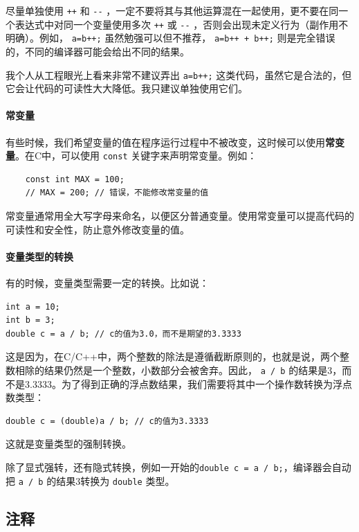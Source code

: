 \begin{remark}{}
    尽量单独使用 \verb|++| 和 \verb|--| ，一定不要将其与其他运算混在一起使用，更不要在同一个表达式中对同一个变量使用多次 \verb|++| 或 \verb|--| ，否则会出现未定义行为（副作用不明确）。例如， \verb|a=b++;| 虽然勉强可以但不推荐， \verb|a=b++ + b++;| 则是完全错误的，不同的编译器可能会给出不同的结果。

    我个人从工程眼光上看来非常不建议弄出 \verb|a=b++;| 这类代码，虽然它是合法的，但它会让代码的可读性大大降低。我只建议单独使用它们。
\end{remark}

\paragraph{常变量}

有些时候，我们希望变量的值在程序运行过程中不被改变，这时候可以使用\textbf{常变量}。在C中，可以使用 \verb|const| 关键字来声明常变量。例如：
\begin{verbatim}
    const int MAX = 100; 
    // MAX = 200; // 错误，不能修改常变量的值
\end{verbatim}
常变量通常用全大写字母来命名，以便区分普通变量。使用常变量可以提高代码的可读性和安全性，防止意外修改变量的值。

\paragraph{变量类型的转换}

有的时候，变量类型需要一定的转换。比如说：
\begin{verbatim}
int a = 10;
int b = 3;
double c = a / b; // c的值为3.0，而不是期望的3.3333
\end{verbatim}
这是因为，在C/C++中，两个整数的除法是遵循截断原则的，也就是说，两个整数相除的结果仍然是一个整数，小数部分会被舍弃。因此， \verb|a / b| 的结果是3，而不是3.3333。为了得到正确的浮点数结果，我们需要将其中一个操作数转换为浮点数类型：
\begin{verbatim}
double c = (double)a / b; // c的值为3.3333
\end{verbatim}

这就是变量类型的强制转换。

除了显式强转，还有隐式转换，例如一开始的\texttt{double c = a / b;}，编译器会自动把 \verb|a / b| 的结果3转换为 \verb|double| 类型。

\subsection{注释}

